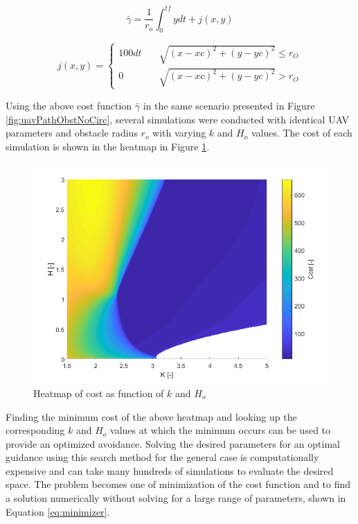 \documentclass[numbered,pdftex]{ohio-etd}
\begin{document}
 \begin{equation}
\label{eq:staticCostWithObst}
\bar{\gamma} = \frac{1}{r_o}\int_{0}^{tf}ydt + j(x,y)
\end{equation}

\begin{equation}
j(x,y) = \left\{
\begin{array}{ll}
100dt & \quad \sqrt{(x-xc)^2+(y-yc)^2} \leq r_O \\
0 & \quad \sqrt{ (x-xc)^2+(y-yc)^2 } > r_O
\end{array}
\right.
\end{equation}


Using the above cost function $\bar{\gamma}$ in the same scenario presented in Figure \ref{fig:uavPathObstNoCirc}, several simulations were conducted with identical UAV parameters and obstacle radius $r_o$ with varying $k$ and $H_o$ values. The cost of each simulation is shown in the heatmap in Figure \ref{fig:costHandR}. 

\begin{figure}[H]
	\centering
	\includegraphics[trim=0 0 0 10,clip,width=16cm]{PaperFigures/Methods/costHandR.png}
	\caption{Heatmap of cost as function of $k$ and $H_o$}
	\label{fig:costHandR}
\end{figure}

Finding the minimum cost of the above heatmap and looking up the corresponding $k$ and $H_o$ values at which the minimum occurs can be used to provide an optimized avoidance. Solving the desired parameters for an optimal guidance using this search method for the general case is computationally expensive and can take many hundreds of simulations to evaluate the desired space. The problem becomes one of minimization of the cost function and to find a solution numerically without solving for a large range of parameters, shown in Equation \ref{eq:minimizer}.
\end{document}
